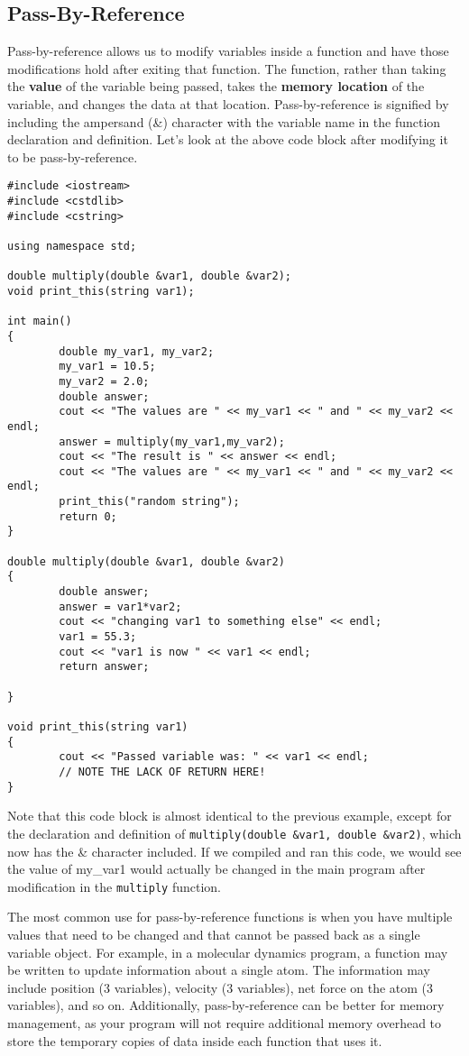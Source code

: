 \subsection{Pass-By-Reference}
Pass-by-reference allows us to modify variables inside a function and have those modifications hold after exiting that function.  The function, rather than taking the \textbf{value} of the variable being passed, takes the \textbf{memory location} of the variable, and changes the data at that location.  Pass-by-reference is signified by including the ampersand (\&) character with the variable name in the function declaration and definition.  Let's look at the above code block after modifying it to be pass-by-reference.

\begin{verbatim}
#include <iostream>
#include <cstdlib>
#include <cstring>

using namespace std;

double multiply(double &var1, double &var2);
void print_this(string var1);

int main()
{
        double my_var1, my_var2;
        my_var1 = 10.5;
        my_var2 = 2.0;
        double answer;
        cout << "The values are " << my_var1 << " and " << my_var2 << endl;
        answer = multiply(my_var1,my_var2);
        cout << "The result is " << answer << endl;
        cout << "The values are " << my_var1 << " and " << my_var2 << endl;
        print_this("random string");
        return 0;
}

double multiply(double &var1, double &var2)
{
        double answer;
        answer = var1*var2;
        cout << "changing var1 to something else" << endl;
        var1 = 55.3;
        cout << "var1 is now " << var1 << endl;
        return answer;

}

void print_this(string var1)
{
        cout << "Passed variable was: " << var1 << endl;
        // NOTE THE LACK OF RETURN HERE!
}
\end{verbatim}

Note that this code block is almost identical to the previous example, except for the declaration and definition of \texttt{multiply(double \&var1, double \&var2)}, which now has the \& character included.  If we compiled and ran this code, we would see the value of my\_var1 would actually be changed in the main program after modification in the \texttt{multiply} function.

The most common use for pass-by-reference functions is when you have multiple values that need to be changed and that cannot be passed back as a single variable object.  For example, in a molecular dynamics program, a function may be written to update information about a single atom.  The information may include position (3 variables), velocity (3 variables), net force on the atom (3 variables), and so on.  Additionally, pass-by-reference can be better for memory management, as your program will not require additional memory overhead to store the temporary copies of data inside each function that uses it.

